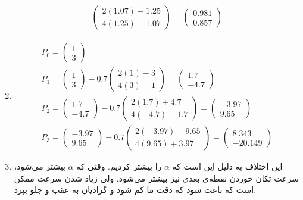 \begin{enumerate}
\begin{gather*}
\begin{pmatrix}
            2(1.07) - 1.25\\
            4(1.25) - 1.07
        \end{pmatrix}
        = \begin{pmatrix}
            0.981\\
            0.857
        \end{pmatrix}
    \end{gather*}
    \item \begin{gather*}
        P_0 = \begin{pmatrix}
            1\\
            3
        \end{pmatrix}\\
        P_1 = \begin{pmatrix}
            1\\
            3
        \end{pmatrix} - 0.7 \begin{pmatrix}
            2(1) - 3\\
            4(3) - 1
        \end{pmatrix}
        = \begin{pmatrix}
            1.7\\
            -4.7
        \end{pmatrix}\\
        P_2 = \begin{pmatrix}
            1.7\\
            -4.7
        \end{pmatrix} - 0.7 \begin{pmatrix}
            2(1.7) + 4.7\\
            4(-4.7) - 1.7
        \end{pmatrix}
        = \begin{pmatrix}
            -3.97\\
            9.65
        \end{pmatrix}\\
        P_3 = \begin{pmatrix}
            -3.97\\
            9.65
        \end{pmatrix} - 0.7 \begin{pmatrix}
            2(-3.97) - 9.65\\
            4(9.65) + 3.97
        \end{pmatrix}
        = \begin{pmatrix}
            8.343\\
            -20.149
        \end{pmatrix}
    \end{gather*}
    \item این اختلاف به دلیل این است که $\alpha$ را بیشتر کردیم. وقتی که $\alpha$ بیشتر می‌شود، سرعت تکان خوردن نقطه‌ی بعدی
    نیز بیشتر می‌شود. ولی زیاد شدن سرعت ممکن است که باعث شود که دقت ما کم شود و گرادیان به عقب و جلو بپرد.
\end{enumerate}